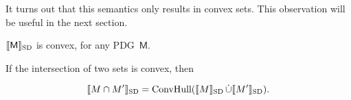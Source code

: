 \documentclass{article}
\newcommand\SD{_{\text{SD}}}
\newcommand{\bmu}{\boldsymbol{\mu}}
\newcommand{\Ed}{\mathcal E}
\newcommand{\sfM}{\mathsf M}
\newcommand{\MN}{PDG}
\newcommand{\MNs}{\MN s}
\numberwithin{equation}{section}
\begin{document}






	
	
	It turns out that this semantics only results in convex sets. This observation will be useful in the next section.

	\begin{lemma}[restate=thmsetconvex] 
		\label{prop:convex}
		$\bbr{\sfM}\SD$ is convex, for any \MN\ $\sfM$.
	\end{lemma}%


	\begin{vfull}
	If the intersection of two sets is convex, then 
	\begin{conj}\label{prop:intersect-set-semantics}
		$$\bbr{M \cap M'}\SD = \text{ConvHull}(\bbr{M}\SD \mathop{\dot\cup} \bbr{M'}\SD).$$
	\end{conj}
	\end{vfull}
	
\end{document}
